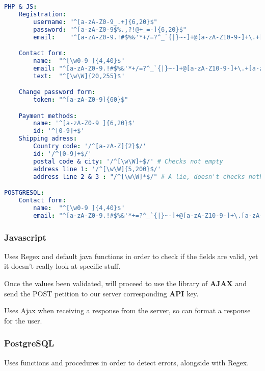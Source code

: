 \begin{lstlisting}[language=yaml,label={lst:regexListing}]
PHP & JS:
    Registration:
        username: "^[a-zA-Z0-9_.+]{6,20}$"
        password: "^[a-zA-Z0-9$%.,?!@+_=-]{6,20}$"
        email:    "^[a-zA-Z0-9.!#$%&'*+/=?^_`{|}~-]+@[a-zA-Z10-9-]+\.+[a-zA-Z0-9-]+$"

    Contact form:
        name:  "^[\w0-9 ]{4,40}$"
        email: "^[a-zA-Z0-9.!#$%&'*+/=?^_`{|}~-]+@[a-zA-Z10-9-]+\.+[a-zA-Z0-9-]+$"
        text:  "^[\w\W]{20,255}$"

    Change password form:
        token: "^[a-zA-Z0-9]{60}$"

    Payment methods:
        name: '^[a-zA-Z0-9 ]{6,20}$'
        id: '^[0-9]+$'
    Shipping adress:
        Country code: '/^[a-zA-Z]{2}$/'
        id: '/^[0-9]+$/'
        postal code & city: '/^[\w\W]+$/' # Checks not empty
        address line 1: '/^[\w\W]{5,200}$/'
        address line 2 & 3 : "/^[\w\W]*$/" # A lie, doesn't checks nothing

POSTGRESQL:
    Contact form:
        name:  "^[\w0-9 ]{4,40}$"
        email: "^[a-zA-Z0-9.!#$%&'*+=?^_`{|}~-]+@[a-zA-Z10-9-]+\.[a-zA-Z0-9-]+$"
\end{lstlisting}

\subsubsection[Javascript]{Javascript}

\begin{flushleft}
    Uses Regex and default java functions in order to check if the fields are valid, yet it doesn't really look at specific stuff.
\end{flushleft}
\begin{flushleft}
    Once the values been validated, will proceed to use the library of \textbf{AJAX} and send the POST petition to our server corresponding \textbf{API} key.
\end{flushleft}

\begin{flushleft}
    Uses Ajax when receiving a response from the server, so can format a response for the user.
\end{flushleft}

\subsubsection[PostgreSQL]{PostgreSQL}

\begin{flushleft}
    Uses functions and procedures in order to detect errors, alongside with Regex.
\end{flushleft}

